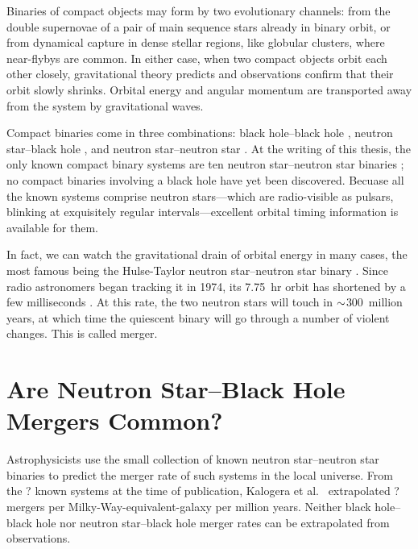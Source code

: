 Binaries of compact objects may form by two evolutionary channels: from the
double supernovae of a pair of main sequence stars already in binary orbit,
or from dynamical capture in dense stellar regions, like globular clusters,
where near-flybys are common.
In either case, when two compact objects orbit each other closely, gravitational
theory predicts \citep{eins1916-integrate_field_eqns,eins1918-grav_waves}
and observations confirm \citep{will2014-review}
that their orbit slowly shrinks. Orbital energy and angular momentum
are transported away from the system by gravitational waves.

Compact binaries come in three combinations: black hole--black hole \bhbh,
neutron star--black hole \nsbh, and neutron star--neutron star \nsns.
At the writing of this thesis,
the only known compact binary systems are ten neutron star--neutron star
\nsns binaries \citep{post2014-evolution_compact_binaries}; no compact binaries
involving a black hole have yet been discovered.
Becuase all the known systems comprise neutron stars---which are radio-visible as
pulsars, blinking at exquisitely regular intervals---excellent orbital timing
information is available for them.

In fact, we can watch the gravitational drain of orbital energy in many
cases, the most famous being the Hulse-Taylor neutron star--neutron star \nsns
binary \citep{huls1975-discovery}.
Since radio astronomers began tracking it in 1974, its 7.75~hr orbit has
shortened by a few milliseconds \citep{weis2010-hulse_taylor_timing}.
At this rate, the two neutron stars will touch in $\mathord{\sim}$300~million years,
at which time the quiescent binary will go through a number of violent changes.
This is called merger.

\section{Are Neutron Star--Black Hole Mergers Common?}
\label{sec:how_common}

Astrophysicists use the small collection of known neutron star--neutron star
binaries \nsns to predict the merger rate of such systems in the local universe.
From the ? known systems at the time of publication, Kalogera et al.\
\citeyearpar{kalo2004-bns_merger_rate, kalo2004-erratum} extrapolated ?
\todo{fill in}
mergers per Milky-Way-equivalent-galaxy per million years.
Neither black hole--black hole \bhbh nor neutron star--black hole \nsbh
merger rates can be extrapolated from observations.

